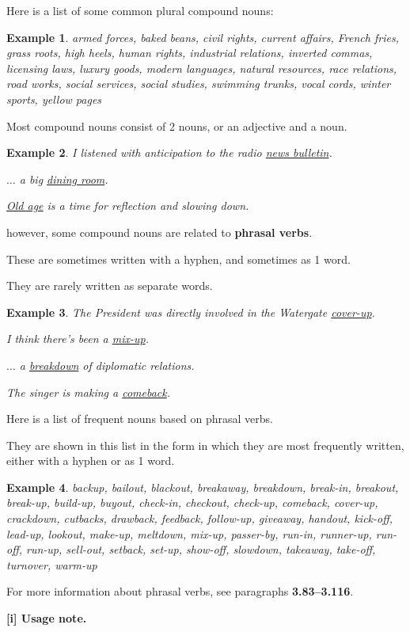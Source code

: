 \documentclass[oneside]{book}
\numberwithin{equation}{section}
\newtheorem{example}{Example}[section]
\begin{document}
%
\noindent{} Here is a list of some common plural compound nouns:
\begin{example}
    armed forces, baked beans, civil rights, current affairs, French fries, grass roots, high heels, human rights, industrial relations, inverted commas, licensing laws, luxury goods, modern languages, natural resources, race relations, road works, social services, social studies, swimming trunks, vocal cords, winter sports, yellow pages
\end{example}
%
\noindent{} Most compound nouns consist of 2 nouns, or an adjective and a noun.
\begin{example}
    I listened with anticipation to the radio \underline{news bulletin}.
    
    $\ldots$ a big \underline{dining room}.
    
    \underline{Old age} is a time for reflection and slowing down.
\end{example}
however, some compound nouns are related to \textbf{phrasal verbs}.

These are sometimes written with a hyphen, and sometimes as 1 word.

They are rarely written as separate words.
\begin{example}
    The President was directly involved in the Watergate \underline{cover-up}.
    
    I think there's been a \underline{mix-up}.
    
    $\ldots$ a \underline{breakdown} of diplomatic relations.
    
    The singer is making a \underline{comeback}.
\end{example}
Here is a list of frequent nouns based on phrasal verbs.

They are shown in this list in the form in which they are most frequently written, either with a hyphen or as 1 word.
\begin{example}
    backup, bailout, blackout, breakaway, breakdown, break-in, breakout, break-up, build-up, buyout, check-in, checkout, check-up, comeback, cover-up, crackdown, cutbacks, drawback, feedback, follow-up, giveaway, handout, kick-off, lead-up, lookout, make-up, meltdown, mix-up, passer-by, run-in, runner-up, run-off, run-up, sell-out, setback, set-up, show-off, slowdown, takeaway, take-off, turnover, warm-up
\end{example}
For more information about phrasal verbs, see paragraphs \textbf{3.83--3.116}.

%
\textbf{[i] Usage note.}
\end{document}
